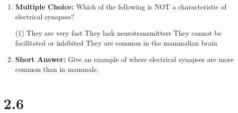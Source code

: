 \begin{enumerate}[label=\textbf{Q2.5.\arabic*}]
      \item \textbf{Multiple Choice:} Which of the following is NOT a characteristic of electrical synapses?
            \begin{tasks}[label=\textcolor{\documentTheme}{(\Alph*)}, item-format=\color{\documentTheme}, label-width=1.5em, item-indent=1.7em](1)
                  \task They are very fast
                  \task They lack neurotransmitters
                  \task They cannot be facilitated or inhibited
                  \task They are common in the mammalian brain
            \end{tasks}
            
      \item \textbf{Short Answer:} Give an example of where electrical synapses are more common than in mammals. \\
\end{enumerate}
\newpage
\squigglyline


\section*{2.6}

